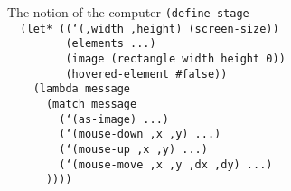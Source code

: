\begin{frame}{The notion of the computer}
  \scriptsize
  \texttt{(define stage\\
    \ \ (let* ((`(,width ,height) (screen-size))\\
    \ \ \ \ \ \ \ \ \ (elements ...)\\
    \ \ \ \ \ \ \ \ \ (image (rectangle width height 0))\\
    \ \ \ \ \ \ \ \ \ (hovered-element \#false))\\
    \ \ \ \ (lambda message\\
    \ \ \ \ \ \ (match message\\
    \ \ \ \ \ \ \ \ (`(as-image) ...)\\
    \ \ \ \ \ \ \ \ (`(mouse-down ,x ,y) ...)\\
    \ \ \ \ \ \ \ \ (`(mouse-up ,x ,y) ...)\\
    \ \ \ \ \ \ \ \ (`(mouse-move ,x ,y ,dx ,dy) ...)\\
    \ \ \ \ \ \ ))))\\
    \ \\
    \ \\
    \ \\
    \ \\
    \ \\
    \ \\
    \ \\
    \ \\
    \ \\
    \ \\
    \ 
}
\end{frame}

